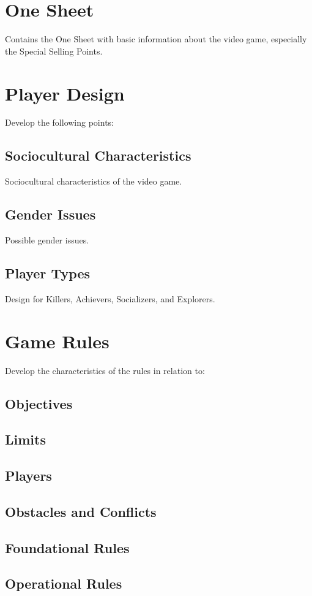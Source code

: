 \section{One Sheet}
Contains the One Sheet with basic information about the video game, especially the Special Selling Points.

\section{Player Design}
Develop the following points:
\subsection{Sociocultural Characteristics}
Sociocultural characteristics of the video game.
\subsection{Gender Issues}
Possible gender issues.
\subsection{Player Types}
Design for Killers, Achievers, Socializers, and Explorers.

\section{Game Rules}
Develop the characteristics of the rules in relation to:
\subsection{Objectives}
\subsection{Limits}
\subsection{Players}
\subsection{Obstacles and Conflicts}
\subsection{Foundational Rules}
\subsection{Operational Rules}
